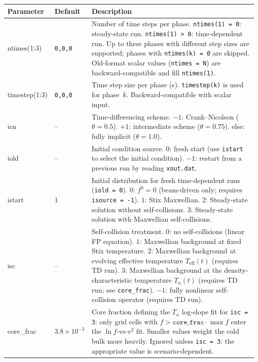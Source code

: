 \documentclass[11pt,a4paper]{article}
\begin{document}
\begin{longtable}{>{\ttfamily}p{3.2cm} p{1.5cm} p{9cm}}
\toprule
\normalfont Parameter & Default & Description \\
\midrule
\endhead
\bottomrule
\endlastfoot

ntimes(1:3) & \texttt{0,0,0} &
  Number of time steps per phase.
  \texttt{ntimes(1) = 0}: steady-state run.
  \texttt{ntimes(1) > 0}: time-dependent run.
  Up to three phases with different step sizes are supported; phases with
  \texttt{ntimes(k) = 0} are skipped.
  Old-format scalar values (\texttt{ntimes = N}) are backward-compatible and
  fill \texttt{ntimes(1)}. \\[4pt]

timestep(1:3) & \texttt{0,0,0} &
  Time step size per phase (s).
  \texttt{timestep(k)} is used for phase~$k$.
  Backward-compatible with scalar input. \\[4pt]

icn & -- &
  Time-differencing scheme.
  $-1$: Crank--Nicolson ($\theta = 0.5$).
  $+1$: intermediate scheme ($\theta = 0.75$).
  else: fully implicit ($\theta = 1.0$). \\[4pt]

iold & -- &
  Initial condition source.
  $0$: fresh start (use \texttt{istart} to select the initial condition).
  $-1$: restart from a previous run by reading \texttt{xout.dat}. \\[4pt]

istart & $1$ &
  Initial distribution for fresh time-dependent runs (\texttt{iold = 0}).
  $0$: $f^0 = 0$ (beam-driven only; requires \texttt{isource = -1}).
  $1$: Stix Maxwellian.
  $2$: Steady-state solution without self-collisions.
  $3$: Steady-state solution with Maxwellian self-collisions. \\[4pt]

isc & -- &
  Self-collision treatment.
  $0$: no self-collisions (linear FP equation).
  $1$: Maxwellian background at fixed Stix temperature.
  $2$: Maxwellian background at evolving effective temperature $T_\mathrm{eff}(t)$
       (requires TD run).
  $3$: Maxwellian background at the density-characteristic temperature $T_n(t)$
       (requires TD run; see \texttt{core\_frac}).
  $-1$: fully nonlinear self-collision operator (requires TD run). \\[4pt]

core\_frac & $3.8\!\times\!10^{-3}$ &
  Core fraction defining the $T_n$ log-slope fit for \texttt{isc = 3}: only grid
  cells with $f > \texttt{core\_frac}\cdot\max f$ enter the $\ln f$-vs-$v^2$ fit.
  Smaller values weight the cold bulk more heavily.  Ignored unless
  \texttt{isc = 3}; the appropriate value is scenario-dependent. \\[4pt]


\end{longtable}
\end{document}
